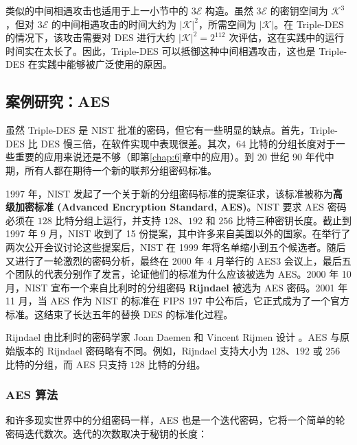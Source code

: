 \begin{snote}
类似的中间相遇攻击也适用于上一小节中的 $3\mathcal{E}$ 构造。虽然 $3\mathcal{E}$ 的密钥空间为 $\mathcal{K}^3$，但对 $3\mathcal{E}$ 的中间相遇攻击的时间大约为 $|\mathcal{K}|^2$，所需空间为 $|\mathcal{K}|$。在 Triple-DES 的情况下，该攻击需要对 DES 进行大约 $|\mathcal{K}|^2=2^{112}$ 次评估，这在实践中的运行时间实在太长了。因此，Triple-DES 可以抵御这种中间相遇攻击，这也是 Triple-DES 在实践中能够被广泛使用的原因。
\end{snote}

\subsection{案例研究：AES}\label{subsec:4-2-4}

虽然 Triple-DES 是 NIST 批准的密码，但它有一些明显的缺点。首先，Triple-DES 比 DES 慢三倍，在软件实现中表现很差。其次，$64$ 比特的分组长度对于一些重要的应用来说还是不够（即第\ref{chap:6}章中的应用）。到 20 世纪 90 年代中期，所有人都在期待一个新的联邦分组密码标准。

\begin{snote}[AES的历程。]
1997 年，NIST 发起了一个关于新的分组密码标准的提案征求，该标准被称为\textbf{高级加密标准 (Advanced Encryption Standard, AES)}。NIST 要求 AES 密码必须在 $128$ 比特分组上运行，并支持 $128$、$192$ 和 $256$ 比特三种密钥长度。截止到 1997 年 9 月，NIST 收到了 15 份提案，其中许多来自美国以外的国家。在举行了两次公开会议讨论这些提案后，NIST 在 1999 年将名单缩小到五个候选者。随后又进行了一轮激烈的密码分析，最终在 2000 年 4 月举行的 AES3 会议上，最后五个团队的代表分别作了发言，论证他们的标准为什么应该被选为 AES。2000 年 10 月，NIST 宣布一个来自比利时的分组密码 \textbf{Rijndael} 被选为 AES 密码。2001 年 11 月，当 AES 作为 NIST 的标准在 FIPS 197 中公布后，它正式成为了一个官方标准。这结束了长达五年的替换 DES 的标准化过程。

Rijndael 由比利时的密码学家 Joan Daemen 和 Vincent Rijmen 设计 \cite{daemen2002design}。AES 与原始版本的 Rijndael 密码略有不同。例如，Rijndael 支持大小为 $128$、$192$ 或 $256$ 比特的分组，而 AES 只支持 $128$ 比特的分组。
\end{snote}

\subsubsection{AES 算法}

和许多现实世界中的分组密码一样，AES 也是一个迭代密码，它将一个简单的轮密码迭代数次。迭代的次数取决于秘钥的长度：

